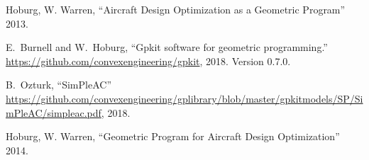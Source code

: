 \documentclass{article}
\begin{document}
\inputminted{python}{../Exemplos/Cap15/wing.py}



\begin{thebibliography}{1}

 Hoburg, W. Warren, ``Aircraft Design
  Optimization as a Geometric Program'' 2013.

 E.~Burnell and W.~Hoburg, ``Gpkit software for
  geometric programming.''
  \url{https://github.com/convexengineering/gpkit}, 2018.
  \newblock Version 0.7.0.

 B.~Ozturk, ``SimPleAC''
  \url{https://github.com/convexengineering/gplibrary/blob/master/gpkitmodels/SP/SimPleAC/simpleac.pdf},
  2018.

 Hoburg, W. Warren, ``Geometric Program for
  Aircraft Design Optimization'' 2014.

  
\end{thebibliography}
\end{document}
